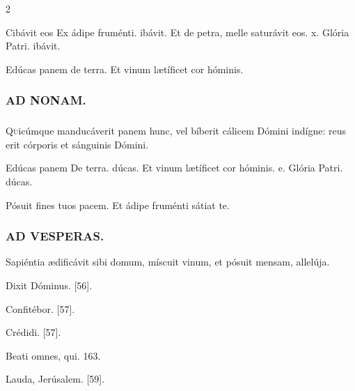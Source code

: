 \documentclass[9pt,twoside]{extarticle}
\begin{document}
\begin{multicols}{2}
\begin{tightlist}{}
\item {} Cibávit eos \textred{*} Ex ádipe fruménti. ibávit.  Et de petra, melle saturávit eos. x. Glória Patri. ibávit.
\item {} Edúcas panem de terra.  Et vinum lætíficet cor hóminis.
\end{tightlist}

\subsubsection*{\center \textsc{AD NONAM.}}
\subsubsection*{}
\lettrine{Q}uicúmque manducáverit panem hunc, vel bíberit cálicem Dómini indígne: reus erit córporis et sánguinis Dómini.

\begin{tightlist}{}
\item {} Edúcas panem \textred{*} De terra. dúcas.  Et vinum lætíficet cor hóminis. e. Glória Patri. dúcas.
\item {} Pósuit fines tuos pacem.  Et ádipe fruménti sátiat te.
\end{tightlist}

\subsubsection*{\center \textsc{AD VESPERAS.}}
\begin{tightlist}{}
\item {} Sapiéntia ædificávit sibi domum, míscuit vinum, et pósuit mensam, allelúja.
\item {} Dixit Dóminus. [56]. 
\item {} Confitébor. [57]. 
\item {} Crédidi. [57]. 
\item {} Beati omnes, qui. 163. 
\item {} Lauda, Jerúsalem. [59].
\end{tightlist}


\end{multicols}
\end{document}
